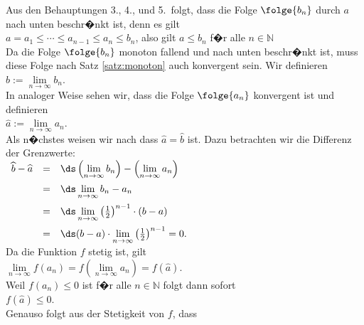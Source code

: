 Aus den Behauptungen 3., 4., und 5.~folgt, dass die Folge $\folge{b_n}$ durch $a$ nach unten
beschr�nkt ist, denn es gilt
\\[0.2cm]
\hspace*{1.3cm} $a = a_1 \leq \cdots \leq a_{n-1} \leq a_n \leq b_n$, 
                also gilt $a \leq b_n$ f�r alle $n\in\mathbb{N}$ \\[0.2cm]
Da die Folge $\folge{b_n}$ monoton fallend und nach unten beschr�nkt ist, muss diese Folge
nach Satz \ref{satz:monoton} auch konvergent sein.  Wir definieren
\\[0.2cm]
\hspace*{1.3cm}
$\widehat{b} := \lim\limits_{n\rightarrow\infty} b_n$.
\\[0.2cm]
In analoger Weise sehen wir, dass die Folge $\folge{a_n}$ konvergent ist und definieren
\\[0.2cm]
\hspace*{1.3cm}
$\widehat{a} := \lim\limits_{n\rightarrow\infty} a_n$.
\\[0.2cm]
Als n�chstes weisen wir nach dass $\widehat{a} = \widehat{b}$ ist.  Dazu betrachten wir
die Differenz der Grenzwerte: 
\\[0.2cm]
\hspace*{1.3cm}
$
\begin{array}[t]{lcl}  
\widehat{b} - \widehat{a} & = &
 \ds\left(\lim\limits_{n\rightarrow\infty} b_n\right) - \left(\lim\limits_{n\rightarrow\infty} a_n\right) \\[0.3cm]
& = & \ds\lim\limits_{n\rightarrow\infty} b_n - a_n \\[0.3cm]
& = & \ds\lim\limits_{n\rightarrow\infty} \left(\frac{1}{2}\right)^{n-1} \cdot (b-a) \\[0.3cm]
& = & \ds (b-a) \cdot \lim\limits_{n\rightarrow\infty} \left(\frac{1}{2}\right)^{n-1} = 0.
\end{array}
$
\\[0.2cm]
Da die Funktion $f$ stetig ist, gilt
\\[0.2cm]
\hspace*{1.3cm}
$\lim\limits_{n\rightarrow\infty} f(a_n) = f\left(\lim\limits_{n\rightarrow\infty} a_n\right) = f(\widehat{a})$.
\\[0.31cm]
Weil $f(a_n) \leq 0$ ist f�r alle $n\in\mathbb{N}$ folgt dann sofort
\\[0.2cm]
\hspace*{1.3cm}
$f(\widehat{a}) \leq 0$.
\\[0.2cm]
Genauso folgt aus der Stetigkeit von $f$, dass
\\[0.2cm]
